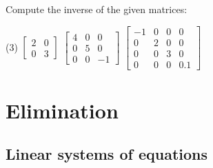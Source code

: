 \begin{exercise}
Compute the inverse of the given matrices:
\begin{tasks}(3)
\task
$\begin{bmatrix}
2 & 0 \\
0 & 3
\end{bmatrix}$
\task
$\begin{bmatrix}
4 & 0 & 0 \\
0 & 5 & 0 \\
0 & 0 & -1
\end{bmatrix}$
\task
$\begin{bmatrix}
-1 & 0 & 0 & 0 \\
0 & 2 & 0 & 0 \\
0 & 0 & 3 & 0 \\
0 & 0 & 0 & 0.1
\end{bmatrix}$
\end{tasks}
\end{exercise}




\sectionnewpage
\section{Elimination}
\label{elim:section}



\subsection{Linear systems of equations}

